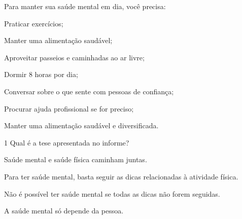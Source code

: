 
\begin{myquote}
Para manter sua saúde mental em dia, você precisa: 

\begin{escolha}
\item Praticar exercícios; 
\item Manter uma alimentação saudável; 
\item Aproveitar passeios e caminhadas ao ar livre;
\item Dormir 8 horas por dia; 
\item Conversar sobre o que sente com pessoas de confiança; 
\item Procurar ajuda profissional se for preciso; 
\item Manter uma alimentação saudável e diversificada.
\end{escolha}
\end{myquote}

\num{1} Qual é a tese apresentada no informe?

\begin{escolha}
\item Saúde mental e saúde física caminham juntas. 
\item Para ter saúde mental, basta seguir as dicas relacionadas à atividade física.
\item Não é possível ter saúde mental se todas as dicas não forem seguidas.
\item A saúde mental só depende da pessoa.
\end{escolha}


